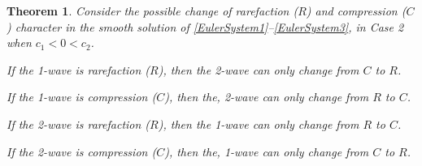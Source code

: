 \documentclass[11pt]{article}
\newtheorem{thm}{Theorem}[section]
\begin{document}
\begin{thm}
	Consider the possible change of rarefaction ($R$) and compression ($C$) character in the smooth solution of \eqref{EulerSystem1}--\eqref{EulerSystem3}, in Case 2 when $c_1<0<c_2$.
	
	If the 1-wave is rarefaction ($R$), then the 2-wave  can only change from $C$ to $R$.
	
	If the 1-wave is compression ($C$), then the, 2-wave can only change from $R$ to $C$.
	
	If the 2-wave is rarefaction ($R$), then the 1-wave  can only change from $R$ to $C$.
	
	If the 2-wave is compression ($C$), then the, 1-wave can only change from $C$ to $R$.
	\label{Theorem:subsonic}
\end{thm} 
\end{document}
